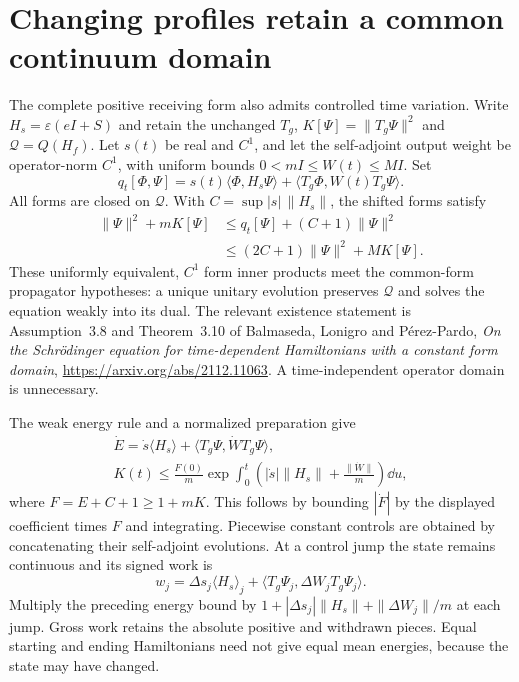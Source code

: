 \section{Changing profiles retain a common continuum domain}\label{sec:changing-profile}
The complete positive receiving form also admits controlled time variation. Write $H_s=\varepsilon(eI+S)$ and retain the unchanged $T_g$, $K[\Psi]=\|T_g\Psi\|^2$ and $\mathcal Q=Q(H_f)$. Let $s(t)$ be real and $C^1$, and let the self-adjoint output weight be operator-norm $C^1$, with uniform bounds $0<mI\le W(t)\le MI$. Set
\[
 q_t[\Phi,\Psi]=s(t)\langle\Phi,H_s\Psi\rangle
             +\langle T_g\Phi,W(t)T_g\Psi\rangle.
\]
All forms are closed on $\mathcal Q$. With $C=\sup|s|\,\|H_s\|$, the shifted forms satisfy
\[
 \begin{aligned}
 \|\Psi\|^2+mK[\Psi]&\le q_t[\Psi]+(C+1)\|\Psi\|^2\\
 &\le(2C+1)\|\Psi\|^2+MK[\Psi].
 \end{aligned}
\]
These uniformly equivalent, $C^1$ form inner products meet the common-form propagator hypotheses: a unique unitary evolution preserves $\mathcal Q$ and solves the equation weakly into its dual. The relevant existence statement is Assumption~3.8 and Theorem~3.10 of Balmaseda, Lonigro and P\'erez-Pardo, \emph{On the Schr\"odinger equation for time-dependent Hamiltonians with a constant form domain}, \url{https://arxiv.org/abs/2112.11063}. A time-independent operator domain is unnecessary.

The weak energy rule and a normalized preparation give
\[
 \begin{gathered}
 \dot E=\dot s\langle H_s\rangle+
       \langle T_g\Psi,\dot W T_g\Psi\rangle,\\
 K(t)\le\frac{F(0)}m\exp\!\int_0^t
       \left(|\dot s|\|H_s\|+\frac{\|\dot W\|}{m}\right)\dd u,
 \end{gathered}
\]
where $F=E+C+1\ge1+mK$. This follows by bounding $|\dot F|$ by the displayed coefficient times $F$ and integrating. Piecewise constant controls are obtained by concatenating their self-adjoint evolutions. At a control jump the state remains continuous and its signed work is
\[
 w_j=\Delta s_j\langle H_s\rangle_j+
             \langle T_g\Psi_j,\Delta W_jT_g\Psi_j\rangle.
\]
Multiply the preceding energy bound by $1+|\Delta s_j|\|H_s\|+\|\Delta W_j\|/m$ at each jump. Gross work retains the absolute positive and withdrawn pieces. Equal starting and ending Hamiltonians need not give equal mean energies, because the state may have changed.

